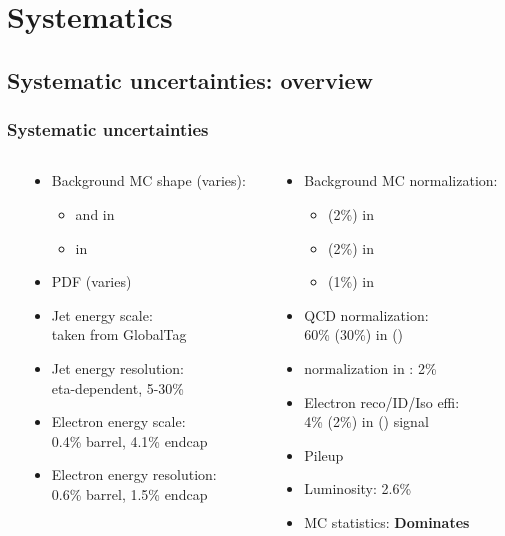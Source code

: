 \documentclass[bigger]{beamer}
\providecommand{\alert}[1]{\textbf{#1}}
\begin{document}
\section{Systematics}
\label{sec-4}
\subsection{Systematic uncertainties: overview}
\label{sec-4-1}
\begin{frame}
\frametitle{Systematic uncertainties}
\label{sec-4-1-1}
\begin{columns} %
\label{sec-4-1-1-1}
\begin{column}{0.55\textwidth}
\label{sec-4-1-1-1-1}

\ChangeItemFont{\footnotesize}{\footnotesize}{\footnotesize}
\begin{itemize}
\item Background MC shape (varies):
\begin{itemize}
\item \wjets and \ttbar in \enujj
\item \zjets in \eejj
\end{itemize}
\item PDF (varies)
\item Jet energy scale: \\
taken from GlobalTag
\item Jet energy resolution: \\
eta-dependent, 5-30\%
\item Electron energy scale: \\
0.4\% barrel, 4.1\% endcap
\item Electron energy resolution: \\
0.6\% barrel, 1.5\% endcap
\end{itemize}
\end{column}
\begin{column}{0.55\textwidth}
\label{sec-4-1-1-1-2}

\ChangeItemFont{\footnotesize}{\footnotesize}{\footnotesize}
\begin{itemize}
\item Background MC normalization:
\begin{itemize}
\item \wjets (2\%) in \enujj
\item \ttbar (2\%) in \enujj
\item \zjets (1\%) in \eejj
\end{itemize}
\item QCD normalization: \\
60\% (30\%) in \eejj (\enujj)
\item \ttbar normalization in \eejj: 2\%
\item Electron reco/ID/Iso effi: \\
4\% (2\%) in \eejj (\enujj) signal
\item Pileup
\item Luminosity: 2.6\%
\item MC statistics: \alert{Dominates}
\end{itemize}
\end{column}
\end{columns}
\end{frame}
\end{document}
